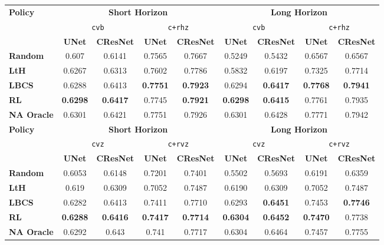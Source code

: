 \begin{tabular}{lcccc|cccc}
\toprule
\multirow{3}{*}{\textbf{Policy}} & \multicolumn{4}{c|}{\textbf{Short Horizon}} & \multicolumn{4}{c}{\textbf{Long Horizon}} \\
\cmidrule(l){2-5}\cmidrule(l){6-9}
 & \multicolumn{2}{c}{\texttt{cvb}} & \multicolumn{2}{c|}{\texttt{c+rhz}} & \multicolumn{2}{c}{\texttt{cvb}} & \multicolumn{2}{c}{\texttt{c+rhz}} \\
 \cmidrule(l){2-3}\cmidrule(l){4-5}\cmidrule(l){6-7}\cmidrule(l){8-9}
 & \textbf{UNet} & \textbf{CResNet} & \textbf{UNet} & \textbf{CResNet} & \textbf{UNet} & \textbf{CResNet} & \textbf{UNet} & \textbf{CResNet} \\
 \midrule
\textbf{Random} & {0.607} & 0.6141 & 0.7565 & 0.7667 & 0.5249 & 0.5432 & 0.6567 & 0.6567 \\
\textbf{LtH } & {0.6267} & 0.6313 & {0.7602} & {0.7786} & 0.5832 & 0.6197 & 0.7325 & 0.7714 \\
\textbf{LBCS } & {0.6288} & {0.6413} & \textbf{0.7751} & \textbf{0.7923} & 0.6294 & \textbf{0.6417} & \textbf{0.7768} & \textbf{0.7941} \\
\textbf{RL } & \textbf{0.6298} & \textbf{0.6417} & {0.7745} & \textbf{0.7921} & \textbf{0.6298} & \textbf{0.6415} & {0.7761} & {0.7935} \\
\midrule
\textbf{NA Oracle } & 0.6301 & 0.6421 & 0.7751 & 0.7926 & 0.6301 & 0.6428 & 0.7771 & 0.7942\\[2mm]
\bottomrule
\toprule
\multirow{3}{*}{\textbf{Policy}} & \multicolumn{4}{c|}{\textbf{Short Horizon}} & \multicolumn{4}{c}{\textbf{Long Horizon}} \\
\cmidrule(l){2-5}\cmidrule(l){6-9}
 & \multicolumn{2}{c}{\texttt{cvz}} & \multicolumn{2}{c|}{\texttt{c+rvz}} & \multicolumn{2}{c}{\texttt{cvz}} & \multicolumn{2}{c}{\texttt{c+rvz}} \\
 \cmidrule(l){2-3}\cmidrule(l){4-5}\cmidrule(l){6-7}\cmidrule(l){8-9}
 & \textbf{UNet} & \textbf{CResNet} & \textbf{UNet} & \textbf{CResNet} & \textbf{UNet} & \textbf{CResNet} & \textbf{UNet} & \textbf{CResNet} \\
 \midrule
\textbf{Random } & {0.6053} & 0.6148 & 0.7201 & 0.7401 & 0.5502 & 0.5693 & 0.6191 & 0.6359 \\
\textbf{LtH } & {0.619} & 0.6309 & {0.7052} & {0.7487} & 0.6190 & 0.6309 & 0.7052 & 0.7487 \\
\textbf{LBCS } & {0.6282} & {0.6413} & {0.7411} & {0.7710} & 0.6293 & \textbf{0.6451} & {0.7453} & \textbf{0.7746} \\
\textbf{RL } & \textbf{0.6288} & \textbf{0.6416} & \textbf{0.7417} & \textbf{0.7714} & \textbf{0.6304} & \textbf{0.6452} & \textbf{0.7470} & {0.7738} \\
\midrule
\textbf{NA Oracle } & 0.6292 & {0.643} & 0.741 & 0.7717 & {0.6304} & {0.6464} & 0.7457 & 0.7755\\
\bottomrule
\end{tabular}

